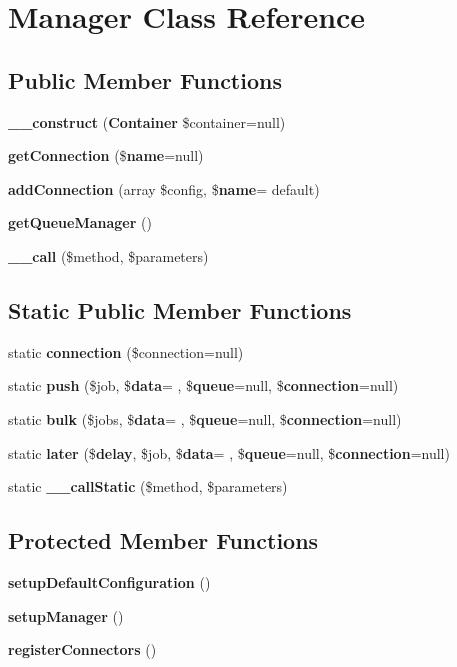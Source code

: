 \section{Manager Class Reference}
\label{class_illuminate_1_1_queue_1_1_capsule_1_1_manager}
\subsection*{Public Member Functions}
\begin{DoxyCompactItemize}
\item 
{\bf \+\_\+\+\_\+construct} ({\bf Container} \$container=null)
\item 
{\bf get\+Connection} (\${\bf name}=null)
\item 
{\bf add\+Connection} (array \$config, \${\bf name}= \textquotesingle{}default\textquotesingle{})
\item 
{\bf get\+Queue\+Manager} ()
\item 
{\bf \+\_\+\+\_\+call} (\$method, \$parameters)
\end{DoxyCompactItemize}
\subsection*{Static Public Member Functions}
\begin{DoxyCompactItemize}
\item 
static {\bf connection} (\$connection=null)
\item 
static {\bf push} (\$job, \${\bf data}= \textquotesingle{}\textquotesingle{}, \${\bf queue}=null, \${\bf connection}=null)
\item 
static {\bf bulk} (\$jobs, \${\bf data}= \textquotesingle{}\textquotesingle{}, \${\bf queue}=null, \${\bf connection}=null)
\item 
static {\bf later} (\${\bf delay}, \$job, \${\bf data}= \textquotesingle{}\textquotesingle{}, \${\bf queue}=null, \${\bf connection}=null)
\item 
static {\bf \+\_\+\+\_\+call\+Static} (\$method, \$parameters)
\end{DoxyCompactItemize}
\subsection*{Protected Member Functions}
\begin{DoxyCompactItemize}
\item 
{\bf setup\+Default\+Configuration} ()
\item 
{\bf setup\+Manager} ()
\item 
{\bf register\+Connectors} ()
\end{DoxyCompactItemize}

